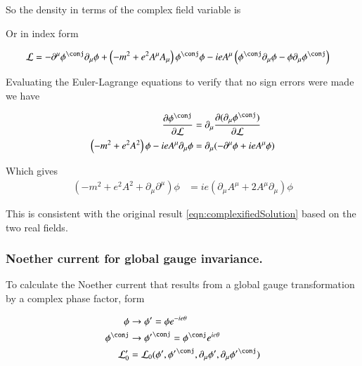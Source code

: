 \documentclass{article}
\begin{document}
So the density in terms of the complex field variable is 

%
Or in index form

\begin{align}\label{eqn:densityComplex}
\LL 
&=
-\partial^\mu \phi^\conj \partial_\mu \phi
+ \left( -m^2 + e^2 A^\mu A_\mu \right) \phi^\conj \phi
- i e A^\mu \left( \phi^\conj \partial_\mu \phi - \phi \partial_\mu \phi^\conj \right)
\end{align}

Evaluating the Euler-Lagrange equations to verify that no sign errors were made we have

\begin{align*}
\PD{\phi^\conj}{\LL}
&=
\partial_\mu \PD{(\partial_\mu \phi^\conj)}{\LL} \\
\left( -m^2 + e^2 A^2 \right) \phi 
- i e A^\mu \partial_\mu \phi
&=
\partial_\mu (-\partial^\mu \phi + i e A^\mu \phi) \\
\end{align*}

Which gives
\begin{align}
\left( -m^2 + e^2 A^2 + \partial_\mu \partial^\mu \right) \phi &= i e (\partial_\mu A^\mu + 2 A^\mu \partial_\mu) \phi
\end{align}

This is consistent with the original result \ref{eqn:complexifiedSolution} based on the two real fields.

\subsubsection{ Noether current for global gauge invariance. }

To calculate the Noether current that results from a global gauge transformation by a complex phase factor, form

\begin{align*}
\phi &\rightarrow \phi' = \phi e^{-i e \theta} \\
\phi^\conj &\rightarrow {\phi'}^\conj = \phi^\conj e^{i e \theta} \\
\LL_0' &= \LL_0( \phi', {\phi'}^\conj, \partial_\mu \phi', \partial_\mu {\phi'}^\conj )
\end{align*}
\end{document}
